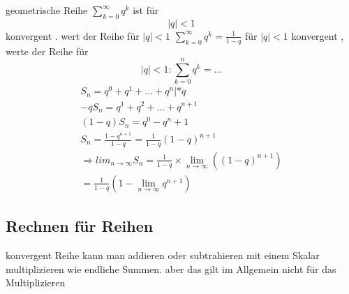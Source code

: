 \begin{example}
geometrische Reihe $ \sum_{k=0}^{\infty} {q^k} $
ist für $$ {|q|} < 1 $$ konvergent . wert der Reihe für $ {|q|} < 1 $  $\sum_{k=0}^{\infty} {q^k}= \frac{1}{1-q} $ für 
$ {|q|} < 1 $  konvergent , werte der Reihe für 
$$ {|q|} <1 : \sum_{k=0}^n{q^k}= \dots $$
\begin{equation}
\begin{aligned}
S_n = q^0 + q^1 + \dots + q^n | *q \\
-q S_n = q^1 + q^2 + \dots + q^{n+1} \\
(1-q)S_n=q^0 - q^n+1 \\
S_n = \frac{1-q^{n+1}}{1-q} = \frac{1}{1-q}(1-q)^{n+1}\\
\Rightarrow lim_{n \to \infty}{S_n} = \frac{1}{1-q} \times 
\lim_{n \to \infty}{((1-q)^{n+1})}\\
=\frac{1}{1-q}(1- \lim_{n \to \infty}{q^{n+1}})
\end{aligned}
\end{equation}
\subsection{Rechnen für Reihen}
konvergent Reihe kann man addieren oder subtrahieren mit einem Skalar multiplizieren
wie endliche Summen.
aber das gilt im Allgemein nicht für das Multiplizieren  
\end{example}